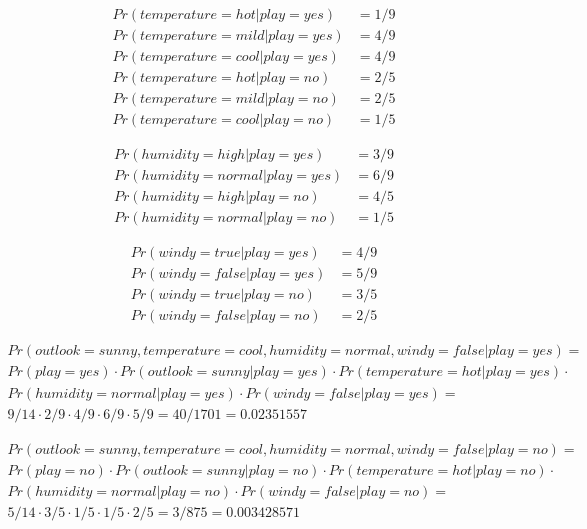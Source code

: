 \documentclass{article}
\begin{document}
		\begin{align}
			Pr(temperature = hot 	| play = yes) &= 1/9 \\
			Pr(temperature = mild | play = yes) &= 4/9 \\
			Pr(temperature = cool | play = yes) &= 4/9 \\
			Pr(temperature = hot 	| play = no) &= 2/5 \\
			Pr(temperature = mild | play = no) &= 2/5 \\
			Pr(temperature = cool | play = no) &= 1/5
		\end{align}

		\begin{align}
			Pr(humidity = high 		| play = yes) &= 3/9 \\
			Pr(humidity = normal 	| play = yes) &= 6/9 \\
			Pr(humidity = high		| play = no) &= 4/5 \\
			Pr(humidity = normal 	| play = no) &= 1/5
		\end{align}

		\begin{align}
			Pr(windy = true 	| play = yes) &= 4/9 \\
			Pr(windy = false 	| play = yes) &= 5/9 \\
			Pr(windy = true 	| play = no) &= 3/5 \\
			Pr(windy = false 	| play = no) &= 2/5
		\end{align}


		\begin{align}
			Pr(outlook = sunny, temperature = cool, humidity = normal, windy = false | play = yes) = \\
			Pr(play = yes) \cdot Pr(outlook = sunny | play = yes) \cdot Pr(temperature = hot 	| play = yes) \cdot \\
			Pr(humidity = normal 	| play = yes) \cdot Pr(windy = false 	| play = yes) = \\
			9/14 \cdot 2/9 \cdot 4/9 \cdot 6/9 \cdot 5/9 = 40/1701 = 0.02351557
		\end{align}

		\begin{align}
			Pr(outlook = sunny, temperature = cool, humidity = normal, windy = false | play = no) = \\
			Pr(play = no) \cdot Pr(outlook = sunny | play = no) \cdot Pr(temperature = hot 	| play = no) \cdot \\
			Pr(humidity = normal 	| play = no) \cdot Pr(windy = false | play = no) =\\
			 5/14 \cdot 3/5 \cdot 1/5 \cdot 1/5 \cdot  2/5 = 3/875 = 0.003428571
		\end{align}
\end{document}
